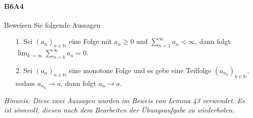 \documentclass{article}
\begin{document}
\paragraph{B6A4}
Beweisen Sie folgende Aussagen
\begin{enumerate}
\item[1.] Sei $(a_n)_{n\in\mathbb{N}}$ eine Folge mit $a_n\geq0$ und $\sum_{n=1}^\infty a_n<\infty$, dann folgt $\lim_{k\to\infty}\sum_{n=k}^\infty a_n=0$.
\item[2.] Sei $(a_n)_{n\in\mathbb{N}}$ eine monotone Folge und es gebe eine Teilfolge $(a_{n_k})_{k\in\mathbb{N}}$, sodass $a_{n_k}\to a$, dann folgt $a_n\to a$.
\end{enumerate}
\emph{Hinweis: Diese zwei Aussagen wurden im Beweis von Lemma 43 verwendet.
Es ist sinnvoll, diesen nach dem Bearbeiten der Übungsaufgabe zu wiederholen.}
\newpage



\end{document}
